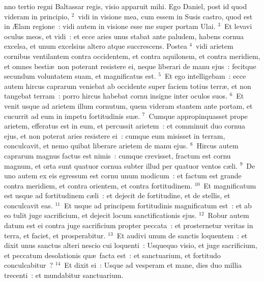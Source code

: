 \bchapter
{}nno tertio regni Baltassar regis, visio apparuit mihi. Ego Daniel, post id quod videram in principio,
${}^{2}$~vidi in visione mea, cum essem in Susis castro, quod est in \AE lam regione~: vidi autem in visione esse me super portam Ulai.
${}^{3}$~Et levavi oculus meos, et vidi~: et ecce aries unus stabat ante paludem, habens cornua excelsa, et unum excelsius altero atque succrescens. Postea
${}^{4}$~vidi arietem cornibus ventilantem contra occidentem, et contra aquilonem, et contra meridiem, et omnes besti\ae\ non poterant resistere ei, neque liberari de manu ejus~: fecitque secundum voluntatem suam, et magnificatus est.
${}^{5}$~Et ego intelligebam~: ecce autem hircus caprarum veniebat ab occidente super faciem totius terr\ae , et non tangebat terram~: porro hircus habebat cornu insigne inter oculos suos.
${}^{6}$~Et venit usque ad arietem illum cornutum, quem videram stantem ante portam, et cucurrit ad eum in impetu fortitudinis su\ae .
${}^{7}$~Cumque appropinquasset prope arietem, efferatus est in eum, et percussit arietem~: et comminuit duo cornua ejus, et non poterat aries resistere ei~: cumque eum misisset in terram, conculcavit, et nemo quibat liberare arietem de manu ejus.
${}^{8}$~Hircus autem caprarum magnus factus est nimis~: cumque crevisset, fractum est cornu magnum, et orta sunt quatuor cornua subter illud per quatuor ventos c\ae li.
${}^{9}$~De uno autem ex eis egressum est cornu unum modicum~: et factum est grande contra meridiem, et contra orientem, et contra fortitudinem.
${}^{10}$~Et magnificatum est usque ad fortitudinem c\ae li~: et dejecit de fortitudine, et de stellis, et conculcavit eas.
${}^{11}$~Et usque ad principem fortitudinis magnificatum est~: et ab eo tulit juge sacrificium, et dejecit locum sanctificationis ejus.
${}^{12}$~Robur autem datum est ei contra juge sacrificium propter peccata~: et prosternetur veritas in terra, et faciet, et prosperabitur.
${}^{13}$~Et audivi unum de sanctis loquentem~: et dixit unus sanctus alteri nescio cui loquenti~: Usquequo visio, et juge sacrificium, et peccatum desolationis qu\ae\ facta est~: et sanctuarium, et fortitudo conculcabitur~?
${}^{14}$~Et dixit ei~: Usque ad vesperam et mane, dies duo millia trecenti~: et mundabitur sanctuarium.


